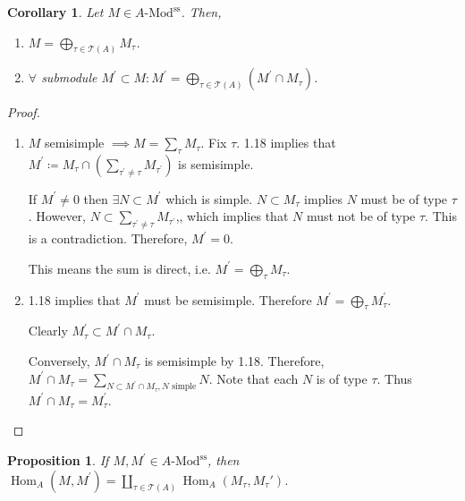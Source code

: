 \documentclass{article}
\theoremstyle{definition}
\theoremstyle{plain}
\newtheorem{proposition}[theorem]{Proposition}
\newtheorem{corollary}[theorem]{Corollary}
\theoremstyle{remark}
\begin{document}
    \begin{corollary}
        Let \(M \in A\text{-Mod}^{\text{ss}}\). Then,
        
        \begin{enumerate}[label=\roman*)]
            \item \(M = \bigoplus_{\tau \in \mathcal{T}(A)} M_{\tau}\).
            \item \(\forall\) submodule \(M^{\prime} \subset M: M^{\prime} = \bigoplus_{\tau \in \mathcal{T}(A)} (M^{\prime} \cap M_{\tau})\).   
        \end{enumerate} 
    \end{corollary}

    \begin{proof}
        \begin{enumerate}[label=\roman*)]
            \item \(M\) semisimple \(\implies M = \sum_{\tau} M_{\tau}\). Fix \(\tau\). 1.18 implies that \(M^{\prime} \coloneqq M_{\tau} \cap \left( \sum_{\tau^{\prime} \neq \tau} M_{\tau^{\prime}} \right)\) is semisimple.
            
            If \(M^{\prime} \neq 0\) then \(\exists N \subset M^{\prime}\) which is simple. \(N \subset M_\tau\) implies \(N\) must be of type \(\tau\). However, \(N \subset \sum_{\tau^{\prime} \neq \tau} M_{\tau^{\prime}}\),, which implies that \(N\) must not be of type \(\tau\). This is a contradiction. Therefore, \(M^{\prime} = 0\).

            This means the sum is direct, i.e. \(M^{\prime} = \bigoplus_{\tau} M_{\tau}\).

            \item 1.18 implies that \(M^{\prime}\) must be semisimple. Therefore \(M^{\prime} = \bigoplus_{\tau} M^{\prime}_{\tau}\).
            
            Clearly \(M_{\tau}^\prime \subset M^{\prime} \cap M_{\tau}\).

            Conversely, \(M^{\prime} \cap M_{\tau}\) is semisimple by 1.18. Therefore, \(M^{\prime} \cap M_{\tau} = \sum_{N \subset M^{\prime} \cap M_{\tau}, N \text{ simple} } N\). Note that each \(N\) is of type \(\tau\). Thus \(M^{\prime} \cap M_\tau = M^\prime_{\tau}\).
        \end{enumerate} 
    \end{proof}

    \begin{proposition}
        If \(M, M^{\prime} \in A \text{-Mod}^{\text{ss}}\), then \(\operatorname{Hom}_A (M,M^{\prime}) = \coprod_{\tau \in \mathcal{T}(A)} \operatorname{Hom}_A(M_{\tau}, M_{\tau}')\). 
    \end{proposition}
\end{document}
